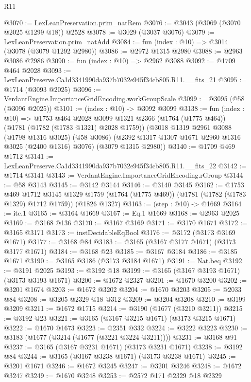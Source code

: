 \begin{lexlean}{R11}
\begin{coremodule}
@3070 := LexLeanPreservation.prim_natRem
@3076 := @3043 (@3069 (@3070 @2025 @1299 @18)) @2528
@3078 := @3029 (@3037 @3076)
@3079 := LexLeanPreservation.prim_natAdd
@3084 := fun (index : @10) => @3014 (@3078 (@3079 @1292 @2980))
@3086 := @2972 @1315 @2980
@3088 := @2963 @3086 @2986
@3090 := fun (index : @10) => @2962 @3088
@3092 := @1709 @464 @2028
@3093 := LexLeanPreserve.Ca1d3341990da937b7032e945f34cb805.R11.__fits_21
@3095 := @1714 (@3093 @2025)
@3096 := VerdantEngine.ImportanceGridEncoding.workGroupScale
@3099 := @3095 (@58 (@3096 @2025))
@3101 := (index : @10) -> @3092 @3099
@3138 := fun (index : @10) =>
  @1753
    @464
    @2028
    @3099
    @1321
    @2366
    (@1764 (@1775 @464))
    (@1781 (@1782 (@1783 @1321) @2028 @1759))
    (@3018
      @1319
      @2961
      @3088
      (@1798 @1316 @3025)
      (@58 @3086)
      (@2392 @1317 @1307 @1671 @2960 @1316 @3025 (@2400 @1316) @3076)
      (@3079 @1315 @2980))
@3140 := @1709 @469 @1712
@3141 := LexLeanPreserve.Ca1d3341990da937b7032e945f34cb805.R11.__fits_22
@3142 := @1714 @3141
@3143 := VerdantEngine.ImportanceGridEncoding.rGroup
@3144 := @58 @3143
@3145 := @3142 @3144
@3146 := @3140 @3145
@3162 := @1753
    @469
    @1712
    @3145
    @1329
    @1759
    (@1764 (@1775 @469))
    (@1781 (@1782 (@1783 @1329) @1712 @1759))
    (@1826 @1327)
@3163 := (step : @10) -> @1669
@3164 := ite.{1}
@3165 := @3164 @1669
@3167 := Eq.{1} @1669
@3168 := @2963 @2025
@3169 := @3168 @136
@3170 := @3167 @3169
@3171 := @3170 @1671
@3172 := @3165 @3171
@3173 := instDecidableEqBool
@3176 := @3172 (@3173 @3169 @1671)
@3177 := @3168 @84
@3183 := @3165 (@3167 @3177 @1671) (@3173 @3177 @1671)
@3184 := @3168 @23
@3185 := @3167 @3184
@3186 := @3185 @1671
@3190 := @3165 @3186 (@3173 @3184 @1671)
@3191 := Nat.beq
@3192 := @3191 @2025
@3193 := @3192 @18
@3199 := @3165 (@3167 @3193 @1671) (@3173 @3193 @1671)
@3200 := @1672 @2327
@3201 := @1670 @3200
@3202 := @3201 @1674
@3203 := @1672 @3202
@3204 := @1670 @3203
@3205 := @2033 @84
@3208 := @3205 @2329 @18 @312
@3209 := @3204 @3208
@3210 := @3199 @3209
@3211 := @1672 @1715
@3214 := @3190 (@1677 (@3210 @3211))
@3215 := @3192 @23
@3221 := @3165 (@3167 @3215 @1671) (@3173 @3215 @1671)
@3222 := @1670 @1673
@3223 := @2351 @332
@3224 := @3222 @3223
@3230 := @3183 (@1677 (@3214 (@1677 (@3221 @3224 @3211))))
@3231 := @3168 @91
@3237 := @3165 (@3167 @3231 @1671) (@3173 @3231 @1671)
@3238 := @3192 @84
@3244 := @3165 (@3167 @3238 @1671) (@3173 @3238 @1671)
@3245 := @3201 @1671
@3246 := @1672 @3245
@3247 := @3201 @3246
@3248 := @1672 @3247
@3249 := @1670 @3248
@3253 := @2572 @171 @2329 @18 @2329

\end{coremodule}
\end{lexlean}
